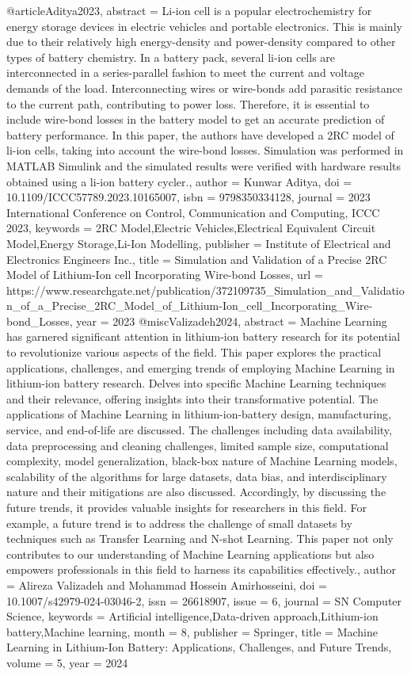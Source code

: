 @article{Aditya2023,
   abstract = {Li-ion cell is a popular electrochemistry for energy storage devices in electric vehicles and portable electronics. This is mainly due to their relatively high energy-density and power-density compared to other types of battery chemistry. In a battery pack, several li-ion cells are interconnected in a series-parallel fashion to meet the current and voltage demands of the load. Interconnecting wires or wire-bonds add parasitic resistance to the current path, contributing to power loss. Therefore, it is essential to include wire-bond losses in the battery model to get an accurate prediction of battery performance. In this paper, the authors have developed a 2RC model of li-ion cells, taking into account the wire-bond losses. Simulation was performed in MATLAB Simulink and the simulated results were verified with hardware results obtained using a li-ion battery cycler.},
   author = {Kunwar Aditya},
   doi = {10.1109/ICCC57789.2023.10165007},
   isbn = {9798350334128},
   journal = {2023 International Conference on Control, Communication and Computing, ICCC 2023},
   keywords = {2RC Model,Electric Vehicles,Electrical Equivalent Circuit Model,Energy Storage,Li-Ion Modelling},
   publisher = {Institute of Electrical and Electronics Engineers Inc.},
   title = {Simulation and Validation of a Precise 2RC Model of Lithium-Ion cell Incorporating Wire-bond Losses},
   url = {https://www.researchgate.net/publication/372109735_Simulation_and_Validation_of_a_Precise_2RC_Model_of_Lithium-Ion_cell_Incorporating_Wire-bond_Losses},
   year = {2023}
}
@misc{Valizadeh2024,
   abstract = {Machine Learning has garnered significant attention in lithium-ion battery research for its potential to revolutionize various aspects of the field. This paper explores the practical applications, challenges, and emerging trends of employing Machine Learning in lithium-ion battery research. Delves into specific Machine Learning techniques and their relevance, offering insights into their transformative potential. The applications of Machine Learning in lithium-ion-battery design, manufacturing, service, and end-of-life are discussed. The challenges including data availability, data preprocessing and cleaning challenges, limited sample size, computational complexity, model generalization, black-box nature of Machine Learning models, scalability of the algorithms for large datasets, data bias, and interdisciplinary nature and their mitigations are also discussed. Accordingly, by discussing the future trends, it provides valuable insights for researchers in this field. For example, a future trend is to address the challenge of small datasets by techniques such as Transfer Learning and N-shot Learning. This paper not only contributes to our understanding of Machine Learning applications but also empowers professionals in this field to harness its capabilities effectively.},
   author = {Alireza Valizadeh and Mohammad Hossein Amirhosseini},
   doi = {10.1007/s42979-024-03046-2},
   issn = {26618907},
   issue = {6},
   journal = {SN Computer Science},
   keywords = {Artificial intelligence,Data-driven approach,Lithium-ion battery,Machine learning},
   month = {8},
   publisher = {Springer},
   title = {Machine Learning in Lithium-Ion Battery: Applications, Challenges, and Future Trends},
   volume = {5},
   year = {2024}
}
